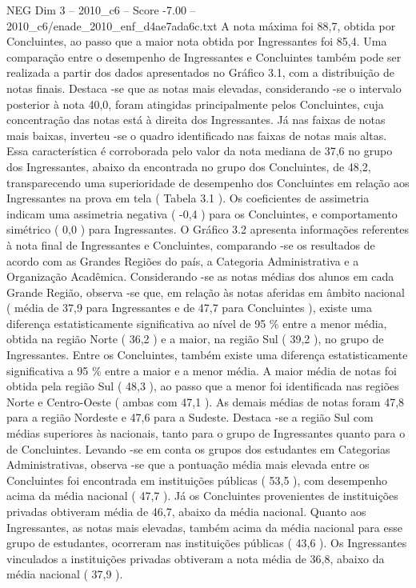\begin{textsample}{NEG Dim 3 – 2010\_c6 – Score -7.00 – 2010\_c6/enade\_2010\_enf\_d4ae7ada6c.txt}
A nota máxima foi 88,7, obtida por Concluintes, ao passo que a maior nota obtida por Ingressantes foi 85,4.
Uma comparação entre o desempenho de Ingressantes e Concluintes também pode ser realizada a partir dos dados apresentados no Gráfico 3.1, com a distribuição de notas finais.
Destaca -se que as notas mais elevadas, considerando -se o intervalo posterior à nota 40,0, foram atingidas principalmente pelos Concluintes, cuja concentração das notas está à direita dos Ingressantes.
Já nas faixas de notas mais baixas, inverteu -se o quadro identificado nas faixas de notas mais altas.
Essa característica é corroborada pelo valor da nota mediana de 37,6 no grupo dos Ingressantes, abaixo da encontrada no grupo dos Concluintes, de 48,2, transparecendo uma superioridade de desempenho dos Concluintes em relação aos Ingressantes na prova em tela ( Tabela 3.1 ).
Os coeficientes de assimetria indicam uma assimetria negativa ( -0,4 ) para os Concluintes, e comportamento simétrico ( 0,0 ) para Ingressantes.
O Gráfico 3.2 apresenta informações referentes à nota final de Ingressantes e Concluintes, comparando -se os resultados de acordo com as Grandes Regiões do país, a Categoria Administrativa e a Organização Acadêmica.
Considerando -se as notas médias dos alunos em cada Grande Região, observa -se que, em relação às notas aferidas em âmbito nacional ( média de 37,9 para Ingressantes e de 47,7 para Concluintes ), existe uma diferença estatisticamente significativa ao nível de 95 \% entre a menor média, obtida na região Norte ( 36,2 ) e a maior, na região Sul ( 39,2 ), no grupo de Ingressantes.
Entre os Concluintes, também existe uma diferença estatisticamente significativa a 95 \% entre a maior e a menor média.
A maior média de notas foi obtida pela região Sul ( 48,3 ), ao passo que a menor foi identificada nas regiões Norte e Centro-Oeste ( ambas com 47,1 ).
As demais médias de notas foram 47,8 para a região Nordeste e 47,6 para a Sudeste.
Destaca -se a região Sul com médias superiores às nacionais, tanto para o grupo de Ingressantes quanto para o de Concluintes.
Levando -se em conta os grupos dos estudantes em Categorias Administrativas, observa -se que a pontuação média mais elevada entre os Concluintes foi encontrada em instituições públicas ( 53,5 ), com desempenho acima da média nacional ( 47,7 ).
Já os Concluintes provenientes de instituições privadas obtiveram média de 46,7, abaixo da média nacional.
Quanto aos Ingressantes, as notas mais elevadas, também acima da média nacional para esse grupo de estudantes, ocorreram nas instituições públicas ( 43,6 ).
Os Ingressantes vinculados a instituições privadas obtiveram a nota média de 36,8, abaixo da média nacional ( 37,9 ).

\end{textsample}

